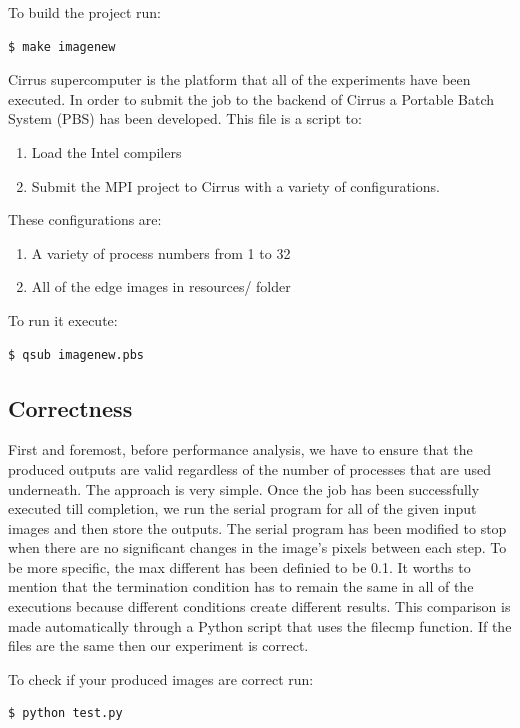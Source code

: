 \documentclass[12pt,a4paper]{article}
\begin{document}
        To build the project run:
        \begin{lstlisting}[language=bash]
          $ make imagenew
        \end{lstlisting}

        Cirrus supercomputer is the platform that all of the experiments have been executed. In order to submit the job to the backend of Cirrus a Portable Batch System (PBS) has been developed. This file is a script to:
        \begin{enumerate}
          \item Load the Intel compilers
          \item Submit the MPI project to Cirrus with a variety of configurations.
        \end{enumerate}

        These configurations are:
        \begin{enumerate}
          \item A variety of process numbers from 1 to 32
          \item All of the edge images in resources/ folder
        \end{enumerate}

        To run it execute:
        \begin{lstlisting}[language=bash]
          $ qsub imagenew.pbs
        \end{lstlisting}

    \subsection{Correctness}
        First and foremost, before performance analysis, we have to ensure that the produced outputs are valid regardless of the number of processes that are used underneath. The approach is very simple. Once the job has been successfully executed till completion, we run the serial program for all of the given input images and then store the outputs. The serial program has been modified to stop when there are no significant changes in the image's pixels between each step. To be more specific, the max different has been definied to be 0.1. It worths to mention that the termination condition has to remain the same in all of the executions because different conditions create different results. This comparison is made automatically through a Python script that uses the filecmp function. If the files are the same then our experiment is correct.

        To check if your produced images are correct run: 
        \begin{lstlisting}[language=bash]
          $ python test.py
        \end{lstlisting}
\end{document}
